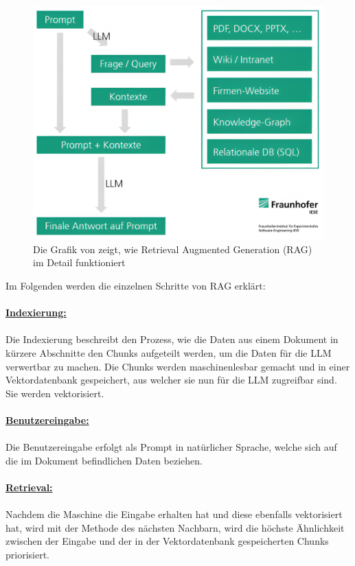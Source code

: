 \documentclass[12pt,toc=bib,toc=listof]{scrreprt}
\begin{document}
\begin{figure} [H]
    \centering
    \includegraphics[width=0.75\linewidth]{./Bilder/Honroth_Wie funktioniert Retrieval Augmented Generation (RAG) im Detail.png}
    \caption{Die Grafik von \textcite{Honroth2024} zeigt, wie Retrieval Augmented Generation (RAG) im Detail funktioniert}
    \label{fig:enter-label}
\end{figure}
\noindent Im Folgenden werden die einzelnen Schritte von RAG erklärt:\\
\\
\textbf{\underline{Indexierung:}}\\
\\
Die Indexierung beschreibt den Prozess, wie die Daten aus einem Dokument in kürzere Abschnitte den Chunks aufgeteilt werden, um die Daten für die LLM verwertbar zu machen. Die Chunks werden maschinenlesbar gemacht und in einer Vektordatenbank gespeichert, aus welcher sie nun für die LLM zugreifbar sind. Sie werden vektorisiert.\\
\\
\textbf{\underline{Benutzereingabe:}}\\
\\
Die Benutzereingabe erfolgt als Prompt in natürlicher Sprache, welche sich auf die im Dokument befindlichen Daten beziehen.\\
\\
\textbf{\underline{Retrieval:}}\\
\\
Nachdem die Maschine die Eingabe erhalten hat und diese ebenfalls vektorisiert hat, wird mit der Methode des nächsten Nachbarn, wird die höchste Ähnlichkeit zwischen der Eingabe und der in der Vektordatenbank gespeicherten Chunks priorisiert.\\
\\
\end{document}

